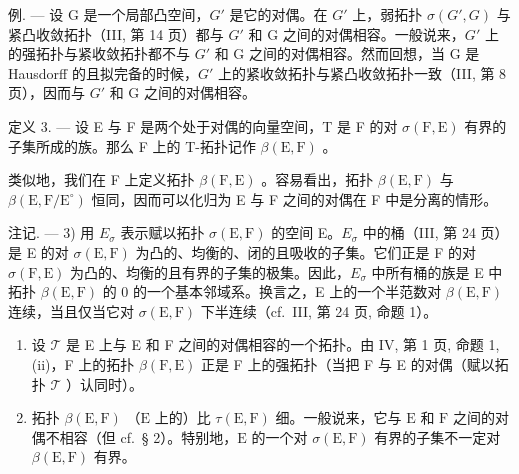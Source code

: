 例. --- 设 G 是一个局部凸空间，\(G'\) 是它的对偶。在 \(G'\) 上，弱拓扑 \(\sigma(G', G)\) 与紧凸收敛拓扑（III, 第 14 页）都与 \(G'\) 和 G 之间的对偶相容。一般说来，\(G'\) 上的强拓扑与紧收敛拓扑都不与 \(G'\) 和 G 之间的对偶相容。然而回想，当 G 是 Hausdorff 的且拟完备的时候，\(G'\) 上的紧收敛拓扑与紧凸收敛拓扑一致（III, 第 8 页），因而与 \(G'\) 和 G 之间的对偶相容。

定义 3. --- 设 E 与 F 是两个处于对偶的向量空间，T 是 F 的对 \(\sigma(\mathrm{F}, \mathrm{E})\) 有界的子集所成的族。那么 F 上的 T-拓扑记作 \(\beta(\mathrm{E}, \mathrm{F})\) 。

类似地，我们在 F 上定义拓扑 \(\beta(\mathrm{F},\mathrm{E})\) 。容易看出，拓扑 \(\beta(\mathrm{E},\mathrm{F})\) 与 \(\beta(\mathrm{E},\mathrm{F}/\mathrm{E}^{\circ})\) 恒同，因而可以化归为 E 与 F 之间的对偶在 F 中是分离的情形。

注记. --- 3) 用 \(E_{\sigma}\) 表示赋以拓扑 \(\sigma(\mathrm{E}, \mathrm{F})\) 的空间 E。\(E_{\sigma}\) 中的桶（III, 第 24 页）是 E 的对 \(\sigma(\mathrm{E}, \mathrm{F})\) 为凸的、均衡的、闭的且吸收的子集。它们正是 F 的对 \(\sigma(\mathrm{F}, \mathrm{E})\) 为凸的、均衡的且有界的子集的极集。因此，\(E_{\sigma}\) 中所有桶的族是 E 中拓扑 \(\beta(\mathrm{E}, \mathrm{F})\) 的 0 的一个基本邻域系。换言之，E 上的一个半范数对 \(\beta(\mathrm{E}, \mathrm{F})\) 连续，当且仅当它对 \(\sigma(\mathrm{E}, \mathrm{F})\) 下半连续（cf.~III, 第 24 页, 命题 1）。

\begin{enumerate}
\def\labelenumi{\arabic{enumi})}
\setcounter{enumi}{3}
\item
  设 \(\mathcal{T}\) 是 E 上与 E 和 F 之间的对偶相容的一个拓扑。由 IV, 第 1 页, 命题 1, (ii)，F 上的拓扑 \(\beta(\mathrm{F},\mathrm{E})\) 正是 F 上的强拓扑（当把 F 与 E 的对偶（赋以拓扑 \(\mathcal{T}\) ）认同时）。
\item
  拓扑 \(\beta(\mathrm{E},\mathrm{F})\) （\(\mathrm{E}\) 上的）比 \(\tau(\mathrm{E},\mathrm{F})\) 细。一般说来，它与 \(\mathrm{E}\) 和 \(\mathrm{F}\) 之间的对偶不相容（但 cf.~§ 2）。特别地，\(\mathrm{E}\) 的一个对 \(\sigma(\mathrm{E},\mathrm{F})\) 有界的子集不一定对 \(\beta(\mathrm{E},\mathrm{F})\) 有界。
\end{enumerate}
\relax{}
